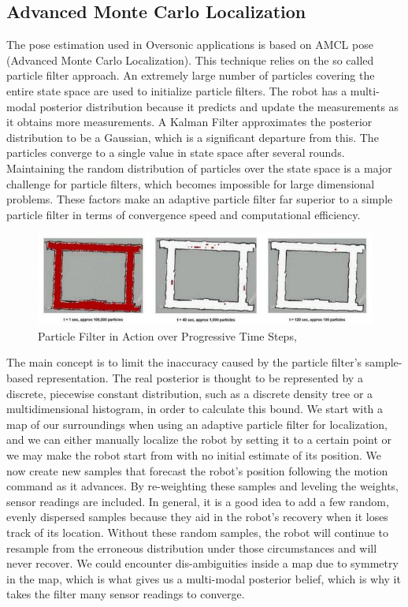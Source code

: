 \subsection{Advanced Monte Carlo Localization}
The pose estimation used in Oversonic applications is based on AMCL pose (Advanced Monte Carlo Localization). 
This technique relies on the so called particle filter approach. An extremely large number of particles covering the entire state space are used to initialize particle filters. The robot has a multi-modal posterior distribution because it predicts and update the measurements as it obtains more measurements. A Kalman Filter approximates the posterior distribution to be a Gaussian, which is a significant departure from this. The particles converge to a single value in state space after several rounds. Maintaining the random distribution of particles over the state space is a major challenge for particle filters, which becomes impossible for large dimensional problems. These factors make an adaptive particle filter far superior to a simple particle filter in terms of convergence speed and computational efficiency. 
\begin{figure}[H]
    \centering
    \includegraphics[scale=0.5]{Images/Chapter 4/amclocalization.png}
    \caption{Particle Filter in Action over Progressive Time Steps, \citet{amclimage}}
    \label{fig:amclpart}
\end{figure}The main concept is to limit the inaccuracy caused by the particle filter's sample-based representation. The real posterior is thought to be represented by a discrete, piecewise constant distribution, such as a discrete density tree or a multidimensional histogram, in order to calculate this bound. We start with a map of our surroundings when using an adaptive particle filter for localization, and we can either manually localize the robot by setting it to a certain point or we may make the robot start from with no initial estimate of its position. We now create new samples that forecast the robot's position following the motion command as it advances. By re-weighting these samples and leveling the weights, sensor readings are included. In general, it is a good idea to add a few random, evenly dispersed samples because they aid in the robot's recovery when it loses track of its location. Without these random samples, the robot will continue to resample from the erroneous distribution under those circumstances and will never recover. We could encounter dis-ambiguities inside a map due to symmetry in the map, which is what gives us a multi-modal posterior belief, which is why it takes the filter many sensor readings to converge.

